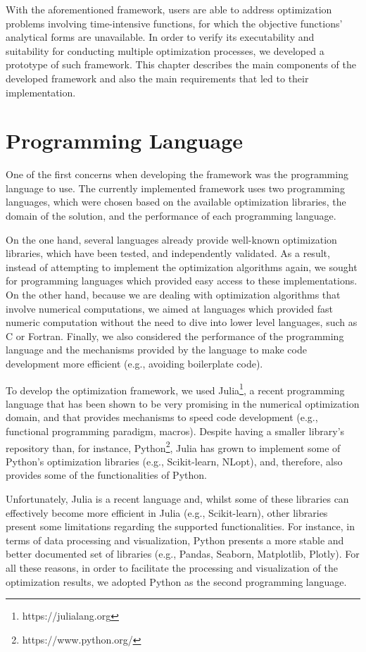 With the aforementioned framework, users are able to address optimization problems involving time-intensive functions, for which the objective functions' analytical forms are unavailable. In order to verify its executability and suitability for conducting multiple optimization processes, we developed a prototype of such framework. This chapter describes the main components of the developed framework and also the main requirements that led to their implementation. 


\section{Programming Language}
One of the first concerns when developing the framework was the programming language to use. The currently implemented framework uses two programming languages, which were chosen based on the available optimization libraries, the domain of the solution, and the performance of each programming language.
 
On the one hand, several languages already provide well-known optimization libraries, which have been tested, and independently validated. As a result, instead of attempting to implement the optimization algorithms again, we sought for programming languages which provided easy access to these implementations. On the other hand, because we are dealing with optimization algorithms that involve numerical computations, we aimed at languages which provided fast numeric computation without the need to dive into lower level languages, such as C or Fortran. Finally, we also considered the performance of the programming language and the mechanisms provided by the language to make code development more efficient (e.g., avoiding boilerplate code).

To develop the optimization framework, we used Julia\footnote{https://julialang.org}, a recent programming language that has been shown to be very promising in the numerical optimization domain, and that provides mechanisms to speed code development (e.g., functional programming paradigm, macros). Despite having a smaller library's repository than, for instance, Python\footnote{https://www.python.org/}, Julia has grown to implement some of Python's optimization libraries (e.g., Scikit-learn, NLopt), and, therefore, also provides some of the functionalities of Python.   

Unfortunately, Julia is a recent language and, whilst some of these libraries can effectively become more efficient in Julia (e.g., Scikit-learn), other libraries present some limitations regarding the supported functionalities. For instance, in terms of data processing and visualization, Python presents a more stable  and better documented set of libraries (e.g., Pandas, Seaborn, Matplotlib, Plotly). For all these reasons, in order to facilitate the processing and visualization of the optimization results, we adopted Python as the second programming language.

